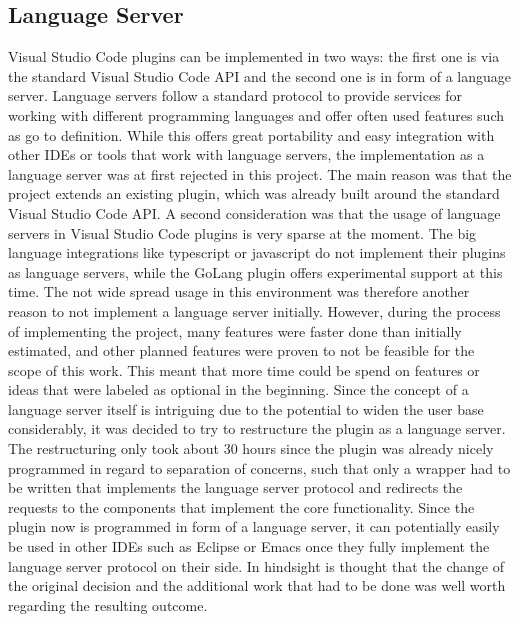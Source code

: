 \subsection{Language Server}

Visual Studio Code plugins can be implemented in two ways: the first one is via the standard Visual Studio Code API and the second one is in form of a language server. Language servers follow a standard protocol to provide services for working with different programming languages and offer often used features such as go to definition. While this offers great portability and easy integration with other IDEs or tools that work with language servers, the implementation as a language server was at first rejected in this project. \newline
The main reason was that the project extends an existing plugin, which was already built around the standard Visual Studio Code API. A second consideration was that the usage of language servers in Visual Studio Code plugins is very sparse at the moment. The big language integrations like typescript or javascript do not implement their plugins as language servers, while the GoLang plugin offers experimental support at this time. The not wide spread usage in this environment was therefore another reason to not implement a language server initially. \newline
However, during the process of implementing the project, many features were faster done than initially estimated, and other planned features were proven to not be feasible for the scope of this work. This meant that more time could be spend on features or ideas that were labeled as optional in the beginning. Since the concept of a language server itself is intriguing due to the potential to widen the user base considerably, it was decided to try to restructure the plugin as a language server. \newline
The restructuring only took about 30 hours since the plugin was already nicely programmed in regard to separation of concerns, such that only a wrapper had to be written that implements the language server protocol and redirects the requests to the components that implement the core functionality. 
Since the plugin now is programmed in form of a language server, it can potentially easily be used in other IDEs such as Eclipse or Emacs once they fully implement the language server protocol on their side. In hindsight is thought that the change of the original decision and the additional work that had to be done was well worth regarding the resulting outcome. \newline

